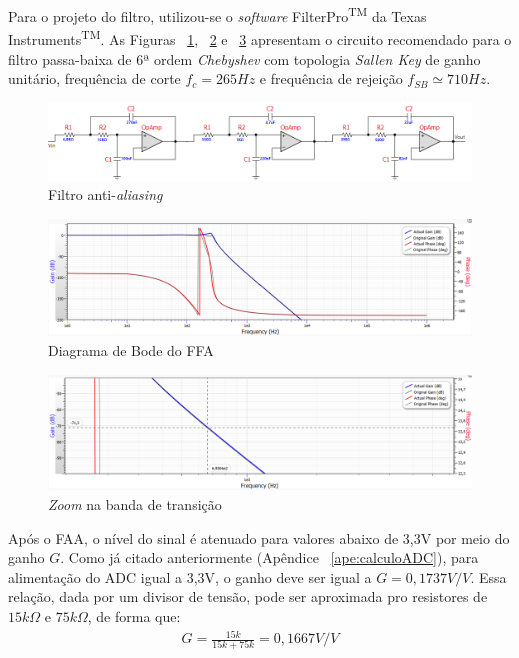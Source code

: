 \documentclass[
	12pt,				%
	openright,			%
	twoside,			%
	a4paper,			%
	english,			%
	french,				%
	spanish,			%
	brazil,				%
	]{abntex2}
\begin{document}
		Para o projeto do filtro, utilizou-se o \textit{software}
		FilterPro\textsuperscript{TM} da Texas
		Instruments\textsuperscript{TM}. As Figuras ~\ref{fig:circuitoFAA},
		~\ref{fig:faaDiagramaBode} e ~\ref{fig:faaDiagramaBodeZoom} apresentam o
		circuito recomendado para o filtro passa-baixa de 6ª ordem
		\textit{Chebyshev} com topologia \textit{Sallen Key} de ganho
		unitário, frequência de corte $f_c = 265Hz$ e frequência de
		rejeição $f_{SB}\simeq 710Hz$.

		\begin{figure}[!ht]
			\centering
			\includegraphics[width=\linewidth]{../Fotos/filterPro.png}
			\caption{Filtro anti-\textit{aliasing}}
			\label{fig:circuitoFAA}
		\end{figure}

		\begin{figure}[!ht]
			\centering
			\includegraphics[width=\linewidth]{../Fotos/filterProGF.png}
			\caption{Diagrama de Bode do FFA}
			\label{fig:faaDiagramaBode}
		\end{figure}

		\begin{figure}[!ht]
			\centering
			\includegraphics[width=\linewidth]{../Fotos/filterProZoom.png}
			\caption{\textit{Zoom} na banda de transição}
			\label{fig:faaDiagramaBodeZoom}
		\end{figure}

		Após o FAA, o nível do sinal é atenuado para valores abaixo de
		3,3V por meio do ganho $G$. Como já citado anteriormente (Apêndice ~\ref{ape:calculoADC}), para
		alimentação do ADC igual a 3,3V, o ganho deve ser igual a $G =
		0,1737V/V$. Essa relação, dada por um divisor de tensão, pode
		ser aproximada pro resistores de $15k\Omega$ e $75k\Omega$, de
		forma que:
		\begin{gather*}
			G = \frac{15k}{15k+75k} = 0,1667V/V
		\end{gather*}
\end{document}
